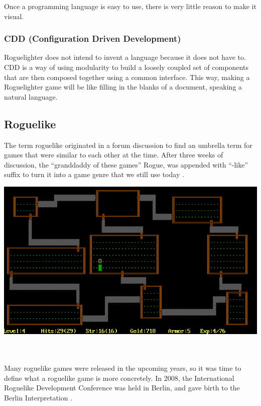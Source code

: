 \documentclass{article}
\begin{document}
Once a programming language is easy to use, there is very little reason to make it visual.

\subsubsection{CDD (Configuration Driven Development)}
Roguelighter does not intend to invent a language because it does not have to. CDD is a way of using modularity to build a loosely coupled set of components that are then composed together using a common interface. This way, making a Roguelighter game will be like filling in the blanks of a document, speaking a natural language.

\subsection{Roguelike}
The term roguelike originated in a forum discussion to find an umbrella term for games that were similar to each other at the time. After three weeks of discussion, the “granddaddy of these games” Rogue, was appended with “-like” suffix to turn it into a game genre that we still use today \cite{roguelike-term}.\\ 

\begin{minipage}{\linewidth}
    \centering
    \includegraphics[width=1\textwidth]{rogue.png}
\end{minipage}\\\\

Many roguelike games were released in the upcoming years, so it was time to define what a roguelike game is more concretely. In 2008, the International Roguelike Development Conference was held in Berlin, and gave birth to the Berlin Interpretation \cite{berlin}.\\
\end{document}

